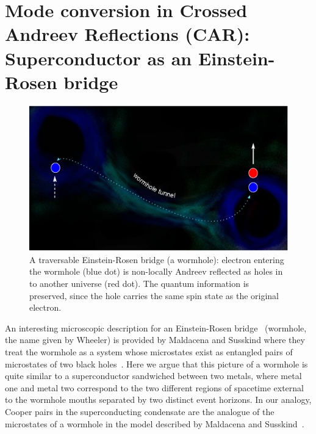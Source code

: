 \documentclass[12pt,letterpaper,aps,onecolumn,superscriptaddress,floatfix,notitlepage]{revtex4-1}
\begin{document}
	\section{Mode conversion in Crossed Andreev Reflections (CAR): Superconductor as an Einstein-Rosen bridge\label{sec4}}
	\begin{figure}
		\includegraphics[scale=0.6]{fig5.eps}
		\caption{A traversable Einstein-Rosen bridge (a wormhole): electron entering the wormhole (blue dot) is non-locally Andreev reflected as holes in to another universe (red dot). The quantum information is preserved, since the hole carries the same spin state as the original electron.\label{cosmos2}}
	\end{figure}
	
	An interesting microscopic description for an Einstein-Rosen bridge~\cite{einstein1935particle} (wormhole, the name given by Wheeler) is provided by Maldacena and Susskind where they treat the wormhole as a system whose microstates exist as entangled pairs of microstates of two black holes~\cite{wepr}. Here we argue that this picture of a wormhole is quite similar to a superconductor sandwiched between two metals, where metal one and metal two correspond to the two different regions of spacetime external to the wormhole mouths separated by two distinct event horizons. In our analogy, Cooper pairs in the superconducting condensate are the analogue of the microstates of a wormhole in the model described by Maldacena and Susskind~\cite{wepr}.
	
\end{document}
